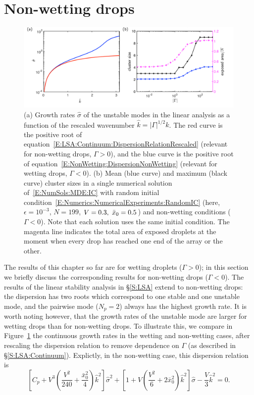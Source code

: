 \section{Non-wetting drops}\label{S:NonWetting}
\begin{figure}
\centering
\includegraphics[scale=0.34]{wetting_non_wetting_comparison}
\caption{(a) Growth rates $\hat{\sigma}$ of the unstable modes in the linear analysis as a function of the rescaled wavenumber $\hat{k} = |\Gamma|^{1/2}k$. The red curve is the positive root of equation~\eqref{E:LSA:Continuum:DispersionRelationRescaled} (relevant for non-wetting drops, $\Gamma >0$), and the blue curve is the positive root of equation~\eqref{E:NonWetting:DispersionNonWetting} (relevant for wetting drops, $\Gamma <0$). (b) Mean (blue curve) and maximum (black curve) cluster sizes in a single numerical solution of~\eqref{E:NumSols:MDE:IC} with random initial condition~\eqref{E:Numerics:NumericalExperiments:RandomIC} (here, $\epsilon = 10^{-3}$, $N = 199$, $V = 0.3,~\bar{x}_0 = 0.5$) and non-wetting conditions ($\Gamma < 0 $). Note that each solution uses the same initial condition. The magenta line indicates the total area of exposed droplets at the moment when every drop has reached one end of the array or the other. } \label{fig:NWD:Comparisons}
\end{figure}
The results of this chapter so far are for wetting droplets ($\Gamma >0$); in this section we briefly discuss the corresponding results for non-wetting drops ($\Gamma < 0$). The results of the linear stability analysis in \S\ref{S:LSA} extend to non-wetting drops: the dispersion has two roots which correspond to one stable and one unstable mode, and the pairwise mode ($N_p = 2$) always has the highest growth rate. It is worth noting however, that the growth rates of the unstable mode are larger for wetting drops than for non-wetting drops. To illustrate this, we compare in Figure~\ref{fig:NWD:Comparisons} the continuous growth rates in the wetting and non-wetting cases, after rescaling the dispersion relation to remove dependence on $\Gamma$ (as described in \S\ref{S:LSA:Continuum}). Explictly, in the non-wetting case, this dispersion relation is
\begin{equation}\label{E:NonWetting:DispersionNonWetting}
\left[C_p + V^3 \left(\frac{V^2}{240} + \frac{\bar{x}_0^2}{4}\right)\hat{k}^2\right]\hat{\sigma}^2 + \left[1 + V\left(\frac{V^2}{6} + 2\bar{x}_0^2\right)\hat{k}^2\right] \hat{\sigma} - \frac{V}{3}\hat{k}^2 = 0.
\end{equation}



